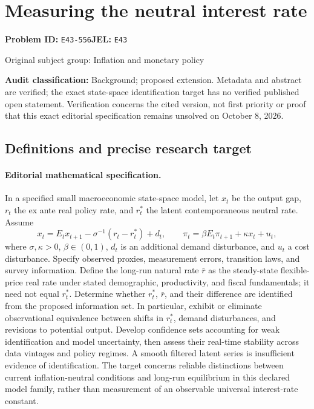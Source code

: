 \documentclass[11pt,a4paper]{article}
\begin{document}
\section*{Measuring the neutral interest rate}
\textbf{Problem ID:} \texttt{E43-556}\quad \textbf{JEL:} \texttt{E43}\par
\label{problem:OP-0245}
{\sffamily\small\color{muted}Original subject group: Inflation and monetary policy\par}
\label{definitions:problem:30007526}
\textbf{Audit classification:} Background; proposed extension. Metadata and abstract are verified; the exact state-space identification target has no verified published open statement. Verification concerns the cited version, not first priority or proof that this exact editorial specification remains unsolved on October 8, 2026.
\subsection*{Definitions and precise research target}
\paragraph{Editorial mathematical specification.} In a specified small macroeconomic state-space model, let \(x_t\) be the output gap, \(r_t\) the ex ante real policy rate, and \(r_t^*\) the latent contemporaneous neutral rate. Assume
\[
x_t=E_tx_{t+1}-\sigma^{-1}(r_t-r_t^*)+d_t,\qquad
\pi_t=\beta E_t\pi_{t+1}+\kappa x_t+u_t,
\]
where \(\sigma,\kappa>0\), \(\beta\in(0,1)\), \(d_t\) is an additional demand disturbance, and \(u_t\) a cost disturbance. Specify observed proxies, measurement errors, transition laws, and survey information. Define the long-run natural rate \(\bar r\) as the steady-state flexible-price real rate under stated demographic, productivity, and fiscal fundamentals; it need not equal \(r_t^*\).
Determine whether \(r_t^*\), \(\bar r\), and their difference are identified from the proposed information set. In particular, exhibit or eliminate observational equivalence between shifts in \(r_t^*\), demand disturbances, and revisions to potential output. Develop confidence sets accounting for weak identification and model uncertainty, then assess their real-time stability across data vintages and policy regimes. A smooth filtered latent series is insufficient evidence of identification. The target concerns reliable distinctions between current inflation-neutral conditions and long-run equilibrium in this declared model family, rather than measurement of an observable universal interest-rate constant.
\end{document}
